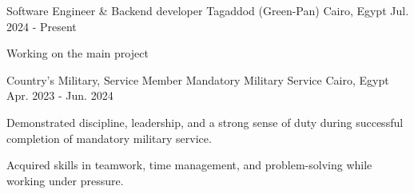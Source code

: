 

\begin{cventries}

  \cventry
    {Software Engineer \& Backend developer} %
    {Tagaddod (Green-Pan)} %
    {Cairo, Egypt} %
    {Jul. 2024 - Present} %
    {
      \begin{cvitems} %
        \item {Working on the main project
        }
      \end{cvitems}
    }

  \cventry
    {Country’s Military, Service Member} %
    {Mandatory Military Service} %
    {Cairo, Egypt} %
    {Apr. 2023 - Jun. 2024 } %
    {
      \begin{cvitems} %
        \item {Demonstrated discipline, leadership, and a strong sense of duty during successful completion of mandatory military service.}
        \item {Acquired skills in teamwork, time management, and problem-solving while working under pressure.}
      \end{cvitems}
    }


\end{cventries}
